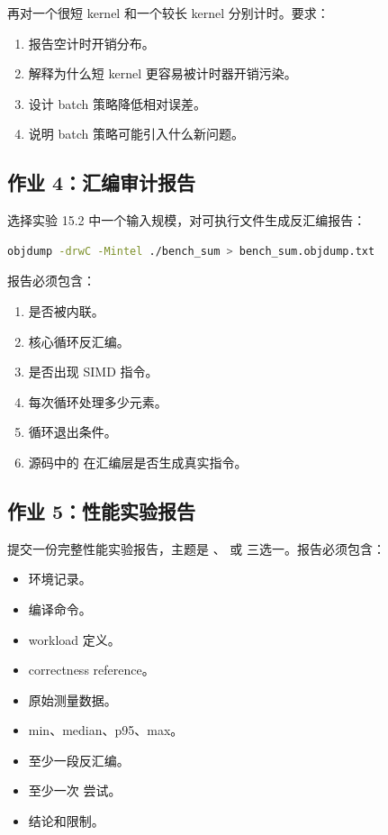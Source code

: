 \begin{exercisebox}
再对一个很短 kernel 和一个较长 kernel 分别计时。要求：

\begin{enumerate}
  \item 报告空计时开销分布。
  \item 解释为什么短 kernel 更容易被计时器开销污染。
  \item 设计 batch 策略降低相对误差。
  \item 说明 batch 策略可能引入什么新问题。
\end{enumerate}

\subsection*{作业 4：汇编审计报告}

选择实验 15.2 中一个输入规模，对可执行文件生成反汇编报告：

\begin{lstlisting}[language=bash]
objdump -drwC -Mintel ./bench_sum > bench_sum.objdump.txt
\end{lstlisting}

报告必须包含：

\begin{enumerate}
  \item {} 是否被内联。
  \item 核心循环反汇编。
  \item 是否出现 SIMD 指令。
  \item 每次循环处理多少元素。
  \item 循环退出条件。
  \item 源码中的  在汇编层是否生成真实指令。
\end{enumerate}

\subsection*{作业 5：性能实验报告}

提交一份完整性能实验报告，主题是 、 或  三选一。报告必须包含：

\begin{itemize}
  \item 环境记录。
  \item 编译命令。
  \item workload 定义。
  \item correctness reference。
  \item 原始测量数据。
  \item min、median、p95、max。
  \item 至少一段反汇编。
  \item 至少一次  尝试。
  \item 结论和限制。
\end{itemize}


\end{exercisebox}
